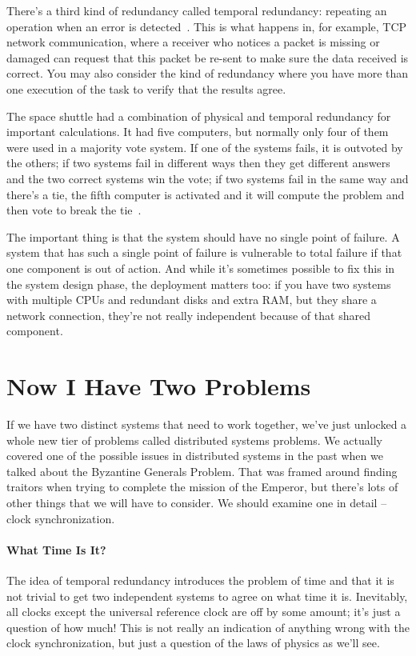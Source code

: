 There's a third kind of redundancy called temporal redundancy: repeating an operation when an error is detected~\cite{osi}. This is what happens in, for example, TCP network communication, where a receiver who notices a packet is missing or damaged can request that this packet be re-sent to make sure the data received is correct. You may also consider the kind of redundancy where you have more than one execution of the task to verify that the results agree.

The space shuttle had a combination of physical and temporal redundancy for important calculations. It had five computers, but normally only four of them were used in a majority vote system. If one of the systems fails, it is outvoted by the others; if two systems fail in different ways then they get different answers and the two correct systems win the vote; if two systems fail in the same way and there's a tie, the fifth computer is activated and it will compute the problem and then vote to break the tie~\cite{mte241}.


The important thing is that the system should have no single point of failure. A system that has such a single point of failure is vulnerable to total failure if that one component is out of action. And while it's sometimes possible to fix this in the system design phase, the deployment matters too: if you have two systems with multiple CPUs and redundant disks and extra RAM, but they share a network connection, they're not really independent because of that shared component.

\section*{Now I Have Two Problems}
If we have two distinct systems that need to work together, we've just unlocked a whole new tier of problems called distributed systems problems. We actually covered one of the possible issues in distributed systems in the past when we talked about the Byzantine Generals Problem. That was framed around finding traitors when trying to complete the mission of the Emperor, but there's lots of other things that we will have to consider. We should examine one in detail -- clock synchronization.

\paragraph{What Time Is It?}
The idea of temporal redundancy introduces the problem of time and that it is not trivial to get two independent systems to agree on what time it is. Inevitably, all clocks except the universal reference clock are off by some amount; it's just a question of how much! This is not really an indication of anything wrong with the clock synchronization, but just a question of the laws of physics as we'll see.

